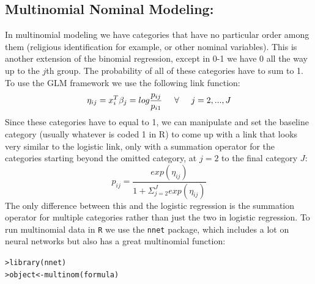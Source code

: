\documentclass[12pt]{article}\usepackage[]{graphicx}\usepackage[]{color}
\makeatletter
\newcommand{\hlstd}[1]{\textcolor[rgb]{0.882,0.878,0.898}{#1}}%
\newcommand{\hlkwb}[1]{\textcolor[rgb]{0.902,0.675,0.196}{#1}}%
\newcommand{\hlkwd}[1]{\textcolor[rgb]{0.733,0.388,0.812}{#1}}%
\newenvironment{kframe}{%
 \def\at@end@of@kframe{}%
 \ifinner\ifhmode%
  \def\at@end@of@kframe{\end{minipage}}%
  \begin{minipage}{\columnwidth}%
 \fi\fi%
 \def\FrameCommand##1{\hskip\@totalleftmargin \hskip-\fboxsep
 \colorbox{shadecolor}{##1}\hskip-\fboxsep
     \hskip-\linewidth \hskip-\@totalleftmargin \hskip\columnwidth}%
 \MakeFramed {\advance\hsize-\width
   \@totalleftmargin\z@ \linewidth\hsize
   \@setminipage}}%
 {\par\unskip\endMakeFramed%
 \at@end@of@kframe}
\newenvironment{knitrout}{}{} %
\makeatother
\begin{document}
\begin{flushleft}






\clearpage
\subsection{Multinomial Nominal Modeling:}

In multinomial modeling we have categories that have no particular order among them (religious identification for example, or other nominal variables). This is another extension of the binomial regression, except in 0-1 we have 0 all the way up to the $j$th group. The probability of all of these categories have to sum to 1. To use the GLM framework we use the following link function:\\
\begin{equation}
\eta_{ij} = x^{T}_i \beta_j = log \frac{p_{ij}}{p_{i1}} \hspace{.5cm} \forall  \hspace{.5cm}  j = 2, ... , J
\end{equation}
Since these categories have to equal to 1, we can manipulate and set the baseline category (usually whatever is coded 1 in R) to come up with a link that looks very similar to the logistic link, only with a summation operator for the categories starting beyond the omitted category, at $j=2$ to the final category $J$:\\
\begin{equation}
 p_{ij} = \frac{exp(\eta_{ij})}{1+ \Sigma^{J}_{j=2} exp (\eta_{ij})   }
\end{equation}
The only difference between this and the logistic regression is the summation operator for multiple categories rather than just the two in logistic regression. To run multinomial data in \texttt{R} we use the \texttt{nnet} package, which includes a lot on neural networks but also has a great multinomial function:\\


\begin{knitrout}
\color{fgcolor}\begin{kframe}
\begin{alltt}
\hlstd{> }\hlkwd{library}\hlstd{(nnet)}
\hlstd{> }\hlstd{object} \hlkwb{<-} \hlkwd{multinom}\hlstd{(formula)}
\end{alltt}
\end{kframe}
\end{knitrout}



\end{flushleft}
\end{document}
